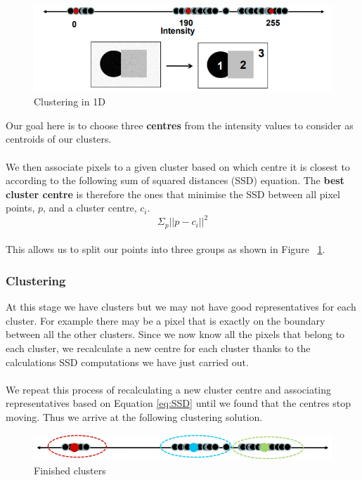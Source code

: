 \documentclass{article}
\begin{document}
\begin{figure}[htp]
    \centering
    \includegraphics[width=12cm]{slide_17_1}
    \caption{Clustering in 1D}
    \label{fig:Slide17_1}
\end{figure}



Our goal here is to choose three \textbf{centres} from the intensity values to consider as centroids of our clusters. 
\\\\
We then associate pixels to a given cluster based on which centre it is closest to according to the following sum of squared distances (SSD) equation. The \textbf{best cluster centre} is therefore the ones that minimise the SSD between all pixel points, $p$, and a cluster centre, $c_i$.
\begin{equation}
 \Sigma_{p} {\vert\vert p - c_i \vert\vert}^2 \label{eq:SSD}
\end{equation}
\\
This allows us to split our points into three groups as shown in Figure ~\ref{fig:Slide17_1}.
\subsubsection{Clustering}
At this stage we have clusters but we may not have good representatives for each cluster. For example there may be a pixel that is exactly on the boundary between all the other clusters. Since we now know all the pixels that belong to each cluster, we recalculate a new centre for each cluster thanks to the calculations SSD computations we have just carried out.
\\\\
We repeat this process of recalculating a new cluster centre and associating representatives based on Equation \ref{eq:SSD} until we found that the centres stop moving. Thus we arrive at the following clustering solution.

\begin{figure}[htp]
    \centering
    \includegraphics[width=12cm]{slide_18_1}
    \caption{Finished clusters}
    \label{fig:Slide18_1}
\end{figure}
\end{document}
